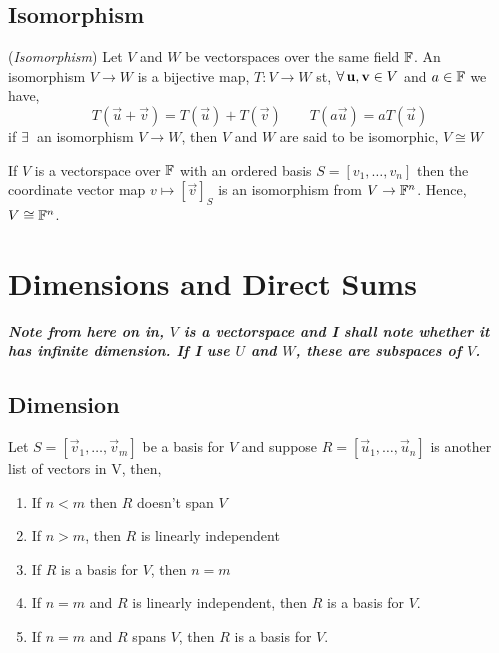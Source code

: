 \documentclass{article}
\begin{document}
\subsection{Isomorphism}
\begin{ndefi}{(\textit{Isomorphism})}
  Let $V$ and $W$ be vectorspaces over the same field $\mathbb{F}$. An isomorphism $V\to W$ is a bijective map, $T: V \to W$ st, $\forall\, \boldsymbol{\mathbf{u}}, \boldsymbol{\mathbf{v}} \in V$ and $a\in\mathbb{F}$ we have,
  $$ T(\vec u + \vec v) = T(\vec u) + T(\vec v) \qquad T(a\vec u) = aT(\vec u)$$
  if $\exists\,$ an isomorphism $V \to W$, then $V$ and $W$ are said to be isomorphic, $V \cong W$
\end{ndefi}

\begin{ncor}
  If $V$ is a vectorspace over $\mathbb{F}$ with an ordered basis $S = [v_1, \dots, v_n]$ then the coordinate vector map $v \mapsto [\vec v]_S$ is an isomorphism from $V \to \mathbb{F}^n$. Hence, $V \cong \mathbb{F}^n$.
\end{ncor}

\section{Dimensions and Direct Sums}

\begin{center}
  \textbf{\textit{Note from here on in, $V$ is a vectorspace and I shall note whether it has infinite dimension. If I use $U$ and $W$, these are subspaces of $V$.}}
\end{center}

\subsection{Dimension}
\begin{ncor}
  Let $S = [\vec v_1, \dots, \vec v_m]$ be a basis for $V$ and suppose $R = [\vec u_1, \dots, \vec u_n]$ is another list of vectors in V, then,
  \begin{enumerate}
    \item If $n < m$ then $R$ doesn't span $V$
    \item If $n > m$, then $R$ is linearly independent
    \item If $R$ is a basis for $V$, then $n = m$
    \item If $n = m$ and $R$ is linearly independent, then $R$ is a basis for $V$.
    \item If $n = m$ and $R$ spans $V$, then $R$ is a basis for $V$.
  \end{enumerate}
\end{ncor}
\end{document}
